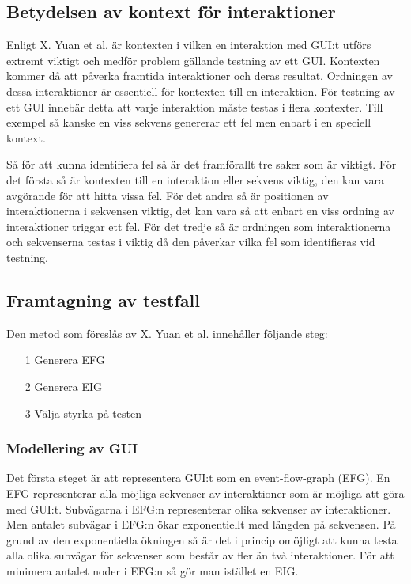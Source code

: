 \subsection{Betydelsen av kontext för interaktioner}

Enligt X. Yuan et al. \cite{yuan2011gui} är kontexten i vilken en interaktion med GUI:t utförs extremt viktigt och medför problem gällande testning av ett GUI. Kontexten kommer då att påverka framtida interaktioner och deras resultat. Ordningen av dessa interaktioner är essentiell för kontexten till en interaktion. För testning av ett GUI innebär detta att varje interaktion måste testas i flera kontexter. Till exempel så kanske en viss sekvens genererar ett fel men enbart i en speciell kontext.

Så för att kunna identifiera fel så är det framförallt tre saker som är viktigt. För det första så är kontexten till en interaktion eller sekvens viktig, den kan vara avgörande för att hitta vissa fel. För det andra så är positionen av interaktionerna i sekvensen viktig, det kan vara så att enbart en viss ordning av interaktioner triggar ett fel. För det tredje så är ordningen som interaktionerna och sekvenserna testas i viktig då den påverkar vilka fel som identifieras vid testning. \cite{yuan2011gui}

\subsection{Framtagning av testfall}

Den metod som föreslås av X. Yuan et al. \cite{yuan2011gui} innehåller följande steg:

\begin{itemize}
	\item [1] Generera EFG
	\item [2] Generera EIG
	\item [3] Välja styrka på testen
\end{itemize}

\subsubsection{Modellering av GUI}

Det första steget är att representera GUI:t som en event-flow-graph (EFG). En EFG representerar alla möjliga sekvenser av interaktioner som är möjliga att göra med GUI:t. Subvägarna i EFG:n representerar olika sekvenser av interaktioner. Men antalet subvägar i EFG:n ökar exponentiellt med längden på sekvensen. På grund av den exponentiella ökningen så är det i princip omöjligt att kunna testa alla olika subvägar för sekvenser som består av fler än två interaktioner. För att minimera antalet noder i EFG:n så gör man istället en EIG. \cite{yuan2011gui}

